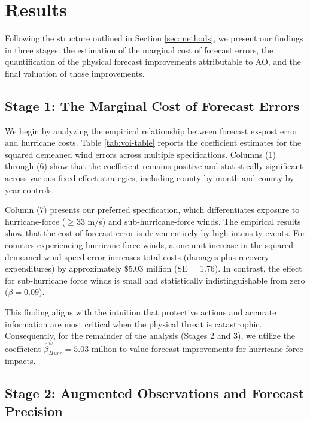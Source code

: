 \documentclass[12pt]{article}%
\begin{document}
\section{Results} \label{sec:results}

Following the structure outlined in Section \ref{sec:methods}, we present our findings in three stages: the estimation of the marginal cost of forecast errors, the quantification of the physical forecast improvements attributable to AO, and the final valuation of those improvements.

\subsection{Stage 1: The Marginal Cost of Forecast Errors}

We begin by analyzing the empirical relationship between forecast ex-post error and hurricane costs. Table \ref{tab:voi-table} reports the coefficient estimates for the squared demeaned wind errors across multiple specifications. Columns (1) through (6) show that the coefficient remains positive and statistically significant across various fixed effect strategies, including county-by-month and county-by-year controls.



Column (7) presents our preferred specification, which differentiates exposure to hurricane-force ($\geq33$ m/s) and sub-hurricane-force winds. The empirical results show that the cost of forecast error is driven entirely by high-intensity events. For counties experiencing hurricane-force winds, a one-unit increase in the squared demeaned wind speed error increases total costs (damages plus recovery expenditures) by approximately \$5.03 million (SE = 1.76). In contrast, the effect for sub-hurricane force winds is small and statistically indistinguishable from zero ($\beta = 0.09$).

This finding aligns with the intuition that protective actions and accurate information are most critical when the physical threat is catastrophic. Consequently, for the remainder of the analysis (Stages 2 and 3), we utilize the coefficient $\hat{\beta}^w_{Hurr} = 5.03$ million to value forecast improvements for hurricane-force impacts.

\subsection{Stage 2: Augmented Observations and Forecast Precision}
\end{document}
